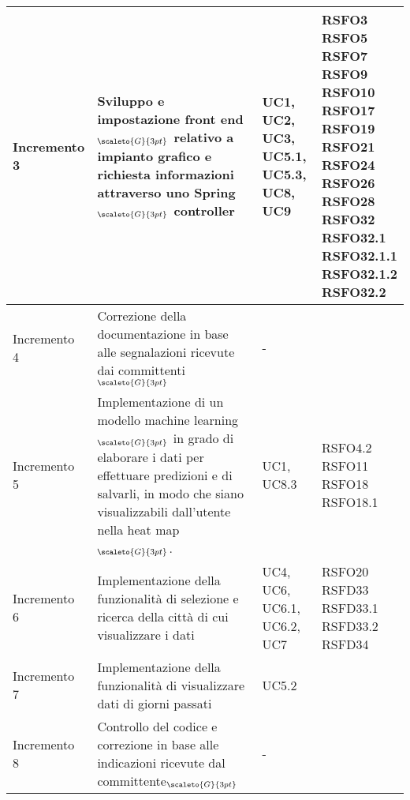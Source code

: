 \begin{center}
\begin{longtable}[c]{p{3cm}|p{5cm}|p{4cm}|p{3cm}}
		\centering Incremento 3 & \centering Sviluppo e impostazione front end$_{\scaleto{G}{3pt}}$ relativo a impianto grafico e richiesta informazioni attraverso uno Spring$_{\scaleto{G}{3pt}}$ controller & \centering UC1, UC2, UC3, UC5.1, UC5.3, UC8, UC9 & \makecell[tc]{RSFO3 \\ RSFO5\\ RSFO7 \\  RSFO9 \\ RSFO10 \\ RSFO17 \\ RSFO19 \\ RSFO21 \\ RSFO24 \\ RSFO26 \\ RSFO28 \\ RSFO32 \\ RSFO32.1 \\ RSFO32.1.1 \\ RSFO32.1.2 \\ RSFO32.2} \\
		\hline
		\centering Incremento 4 & \centering Correzione della documentazione in base alle segnalazioni ricevute dai committenti$_{\scaleto{G}{3pt}}$ & \centering - & \makecell[tc]{-} \\
		\hline
		\centering Incremento 5 & \centering Implementazione di  un modello machine learning$_{\scaleto{G}{3pt}}$ in grado di elaborare i dati per effettuare predizioni e di salvarli, in modo che siano visualizzabili dall'utente nella heat map$_{\scaleto{G}{3pt}}$. & \centering UC1, UC8.3 & \makecell[tc]{RSFO4.2 \\ RSFO11 \\ RSFO18 \\	RSFO18.1} \\
		\hline
		\centering Incremento 6 & \centering Implementazione della funzionalità di selezione e ricerca
		della città di cui visualizzare i dati & \centering UC4, UC6, UC6.1, UC6.2, UC7 & \makecell[tc]{RSFO20 \\ RSFD33 \\ RSFD33.1 \\ RSFD33.2 \\ RSFD34} \\
		\hline
		\centering Incremento 7 & \centering Implementazione della funzionalità di visualizzare dati di giorni passati & \centering UC5.2 & \makecell[tc]{RSFO27} \\
		\hline
		\centering Incremento 8 & \centering Controllo del codice e correzione in base alle indicazioni ricevute dal committente$_{\scaleto{G}{3pt}}$ & \centering - & \makecell[tc]{-} \\

\end{longtable}
\end{center}

